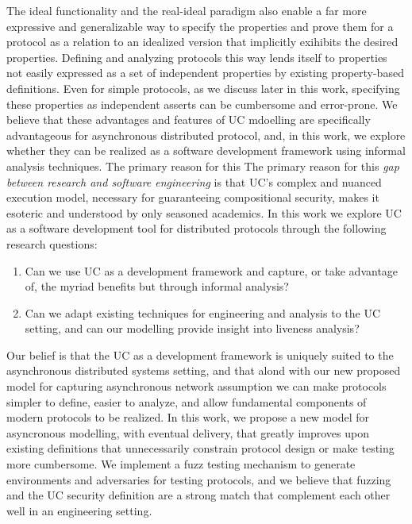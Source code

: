 The ideal functionality and the real-ideal paradigm also enable a far more expressive and generalizable way to specify the properties and prove them for a protocol as a relation to an idealized version that implicitly exihibits the desired properties.
Defining and analyzing protocols this way lends itself to properties not easily expressed as a set of independent properties by existing property-based definitions.
Even for simple protocols, as we discuss later in this work, specifying these properties as independent asserts can be cumbersome and error-prone. 
We believe that these advantages and features of UC mdoelling are specifically advantageous for asynchronous distributed protocol, and, in this work, we explore whether they can be realized as a software development framework using informal analysis techniques.
The primary reason for this
The primary reason for this \emph{gap between research and software engineering} is that UC's complex and nuanced execution model, necessary for guaranteeing compositional security, makes it esoteric and understood by only seasoned academics. 
In this work we explore UC as a software development tool for distributed protocols through the following research questions:
\begin{enumerate}[label=(RQ\arabic*).,leftmargin=*]
\item Can we use UC as a development framework and capture, or take advantage of, the myriad benefits but through informal analysis?
\item Can we adapt existing techniques for engineering and analysis to the UC setting, and can our modelling provide insight into liveness analysis?
\end{enumerate}
Our belief is that the UC as a development framework is uniquely suited to the asynchronous distributed systems setting, and that alond with our new proposed model for capturing asynchronous network assumption we can make protocols simpler to define, easier to analyze, and allow fundamental components of modern protocols to be realized.
In this work, we propose a new model for asyncronous modelling, with eventual delivery, that greatly improves upon existing definitions that unnecessarily constrain protocol design or make testing more cumbersome.
We implement a fuzz testing mechanism to generate environments and adversaries for testing protocols, and we believe that fuzzing and the UC security definition are a strong match that complement each other well in an engineering setting. 


